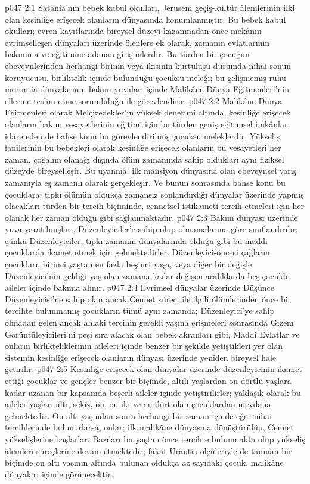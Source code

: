 \vs p047 2:1 Satania’nın bebek kabul okulları, Jerusem geçiş\hyp{}kültür âlemlerinin ilki olan kesinliğe erişecek olanların dünyasında konumlanmıştır. Bu bebek kabul okulları; evren kayıtlarında bireysel düzeyi kazanmadan önce mekânın evrimselleşen dünyaları üzerinde ölenlere ek olarak, zamanın evlatlarının bakımına ve eğitimine adanan girişimlerdir. Bu türden bir çocuğun ebeveynlerinden herhangi birinin veya ikisinin kurtuluşu durumda nihai sonun koruyucusu, birliktelik içinde bulunduğu çocuksu meleği; bu gelişmemiş ruhu morontia dünyalarının bakım yuvaları içinde Malikâne Dünya Eğitmenleri’nin ellerine teslim etme sorumluluğu ile görevlendirir.
\vs p047 2:2 Malikâne Dünya Eğitmenleri olarak Melçizedekler’in yüksek denetimi altında, kesinliğe erişecek olanların bakım vesayetlerinin eğitimi için bu türden geniş eğitimsel imkânları idare eden de bahse konu bu görevlendirilmiş çocuksu meleklerdir. Yükseliş fanilerinin bu bebekleri olarak kesinliğe erişecek olanların bu vesayetleri her zaman, çoğalım olanağı dışında ölüm zamanında sahip oldukları aynı fiziksel düzeyde bireyselleşir. Bu uyanma, ilk mansiyon dünyasına olan ebeveynsel varış zamanıyla eş zamanlı olarak gerçekleşir. Ve bunun sonrasında bahse konu bu çocuklara; tıpkı ölümün oldukça zamansız sonlandırdığı dünyalar üzerinde yapmış olacakları türden bir tercih biçiminde, cennetsel istikameti tercih etmeleri için her olanak her zaman olduğu gibi sağlanmaktadır.
\vs p047 2:3 Bakım dünyası üzerinde yuva yaratılmışları, Düzenleyiciler’e sahip olup olmamalarına göre sınıflandırılır; çünkü Düzenleyiciler, tıpkı zamanın dünyalarında olduğu gibi bu maddi çocuklarda ikamet etmek için gelmektedirler. Düzenleyici\hyp{}öncesi çağların çocukları; birinci yaştan en fazla beşinci yaşa, veya diğer bir değişle Düzenleyici’nin geldiği yaş olan zamana kadar değişen aralıklarda beş çocuklu aileler içinde bakıma alınır.
\vs p047 2:4 Evrimsel dünyalar üzerinde Düşünce Düzenleyicisi’ne sahip olan ancak Cennet süreci ile ilgili ölümlerinden önce bir tercihte bulunmamış çocukların tümü aynı zamanda; Düzenleyici’ye sahip olmadan gelen ancak ahlaki tercihin gerekli yaşına erişmeleri sonrasında Gizem Görüntüleyicileri’ni peşi sıra alacak olan bebek akranları gibi, Maddi Evlatlar ve onların birlikteliklerinin aileleri içinde benzer bir şekilde yetiştikleri yer olan sistemin kesinliğe erişecek olanların dünyası üzerinde yeniden bireysel hale getirilir.
\vs p047 2:5 Kesinliğe erişecek olan dünyalar üzerinde düzenleyicinin ikamet ettiği çocuklar ve gençler benzer bir biçimde, altılı yaşlardan on dörtlü yaşlara kadar uzanan bir kapsamda beşerli aileler içinde yetiştirilirler; yaklaşık olarak bu aileler yaşları altı, sekiz, on, on iki ve on dört olan çocuklardan meydana gelmektedir. On altı yaşından sonra herhangi bir zaman içinde eğer nihai tercihlerinde bulunurlarsa, onlar; ilk malikâne dünyasına dönüştürülüp, Cennet yükselişlerine başlarlar. Bazıları bu yaştan önce tercihte bulunmakta olup yükseliş âlemleri süreçlerine devam etmektedir; fakat Urantia ölçüleriyle de tanınan bir biçimde on altı yaşının altında bulunan oldukça az sayıdaki çocuk, malikâne dünyaları içinde görünecektir.
